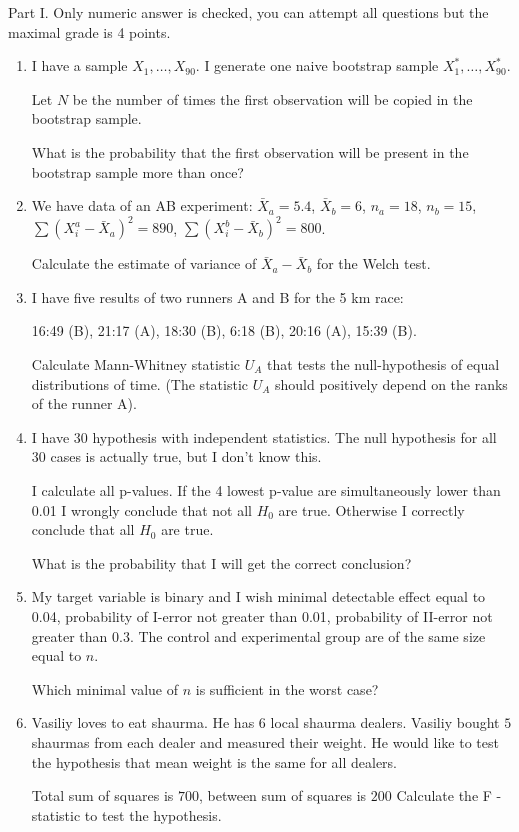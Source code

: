 \documentclass[12pt]{article}
\begin{document}
Part I. Only numeric answer is checked, you can attempt all questions but the maximal grade is 4 points. 
	\begin{enumerate}
	\item I have a sample \(X_1, \ldots, X_{90}\).
	I generate one naive bootstrap sample \(X^*_1, \ldots, X^*_{90}\).
	
	Let \(N\) be the number of times the first observation will be copied in the bootstrap sample.
	
	
	What is the probability that the first observation will be present in the bootstrap sample more than once?
	
		
	
	\item We have data of an AB experiment: \(\bar X_a = 5.4\), \(\bar X_b = 6\),
		\(n_a = 18\), \(n_b = 15\), \(\sum (X_i^a - \bar X_a)^2 = 890\),
		\(\sum (X_i^b - \bar X_b)^2 = 800\).

		Calculate the estimate of variance of \(\bar X_a - \bar X_b\) for the Welch test.

		\item I have five results of two runners A and B for the 5 km race:

		16:49 (B), 21:17 (A), 18:30 (B), 6:18 (B), 20:16 (A), 15:39 (B).
		
		Calculate Mann-Whitney statistic \(U_A\) that tests the null-hypothesis of equal distributions of time.
		(The statistic \(U_A\) should positively depend on the ranks of the runner A).
		\item I have 30 hypothesis with independent statistics. The null hypothesis for all 30
		cases is actually true, but I don't know this.
		
		I calculate all p-values.
		If the 4 lowest p-value are simultaneously lower than 0.01 I wrongly conclude that not all \(H_0\) are true. Otherwise I correctly conclude that all \(H_0\) are true.
		
		What is the probability that I will get the correct conclusion?
		
		\item My target variable is binary and I wish minimal detectable effect equal to 0.04, probability of I-error not greater than 0.01, probability of II-error not greater than 0.3. The control and experimental group
		are of the same size equal to \(n\).
		
		Which minimal value of \(n\) is sufficient in the worst case?
		\item Vasiliy loves to eat shaurma. He has \(6\) local shaurma dealers. Vasiliy bought \(5\) shaurmas
from each dealer and measured their weight. He would like to test the hypothesis that mean weight is the
same for all dealers.

Total sum of squares is \(700\), between sum of squares is \(200\)
Calculate the F -statistic to test the hypothesis.
		
		
	\end{enumerate}
	\newpage
\end{document}
